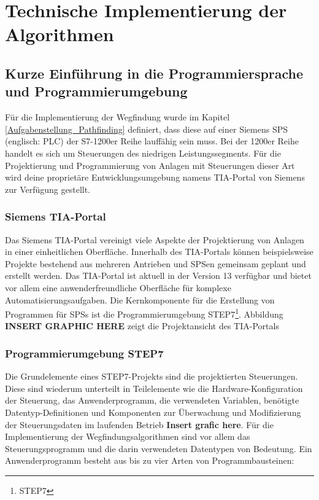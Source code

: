 \chapter{Technische Implementierung der Algorithmen}
	\label{Implementierung}
	\section{Kurze Einführung in die Programmiersprache und Programmierumgebung}
	
		Für die Implementierung der Wegfindung wurde im Kapitel \ref{Aufgabenstellung_Pathfinding} definiert, dass diese auf einer Siemens \ac{SPS} (englisch: \ac{PLC})  der S7-1200er Reihe lauffähig sein muss. Bei der 1200er Reihe handelt es sich um  Steuerungen des niedrigen Leistungssegments. Für die Projektierung und Programmierung von Anlagen mit Steuerungen dieser Art wird deine proprietäre Entwicklungsumgebung namens \ac{TIA-Portal} von Siemens zur Verfügung gestellt.
		
		\subsection{Siemens TIA-Portal}
		
			Das Siemens \ac{TIA-Portal} vereinigt viele Aspekte der Projektierung von Anlagen in einer einheitlichen Oberfläche. Innerhalb des \ac{TIA-Portal}s können beispielsweise Projekte bestehend aus mehreren Antrieben und \ac{SPS}en gemeinsam geplant und erstellt werden. Das  \ac{TIA-Portal} ist aktuell in der Version 13 verfügbar und bietet vor allem eine anwenderfreundliche Oberfläche für komplexe Automatisierungsaufgaben. Die Kernkomponente für die Erstellung von Programmen für \aclp{SPS} ist die Programmierumgebung \acs{STEP7}\footnote{\ac{STEP7}}. Abbildung \textbf{INSERT GRAPHIC HERE} zeigt die Projektansicht des \ac{TIA-Portal}s 
		
		\subsection{Programmierumgebung STEP7}
			Die Grundelemente eines \ac{STEP7}-Projekts sind die projektierten Steuerungen. Diese sind wiederum unterteilt in Teilelemente wie die Hardware-Konfiguration der Steuerung, das Anwenderprogramm, die verwendeten Variablen, benötigte Datentyp-Definitionen und Komponenten zur Überwachung und Modifizierung der Steuerungsdaten im laufenden Betrieb \textbf{Insert grafic here}. Für die Implementierung der Wegfindungsalgorithmen sind vor allem das Steuerungsprogramm und die darin verwendeten Datentypen von Bedeutung. Ein Anwenderprogramm besteht aus bis zu vier Arten von Programmbausteinen\cite{STEP7Prog}:\\
			
